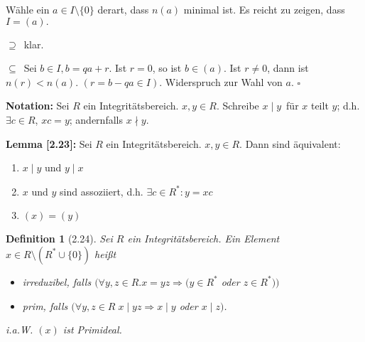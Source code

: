 \documentclass[10pt,a4paper]{article}
\newtheorem{defi}{Definition}
\begin{document}
Wähle ein $a \in I \setminus \{0\}$ derart, dass $n(a)$ minimal ist. Es reicht zu zeigen, dass $I = (a).$

\glqq $\supseteq$\grqq\ klar.

\glqq $\subseteq$\grqq\ Sei $b \in I, b = qa + r$. Ist $r = 0$, so ist $b \in (a)$. Ist $r \neq 0$, dann ist $n(r) < n(a)$. $(r = b - qa \in I)$. Widerspruch zur Wahl von $a$. $\square$\bigskip

\textbf{Notation:} Sei $R$ ein Integritätsbereich. $x,y \in R$. Schreibe \glqq $x \mid y$\grqq\ für \glqq $x$ teilt $y$\grqq ; d.h. $\exists c \in R$, $xc = y$; andernfalls \glqq $x \nmid y$\grqq .

\textbf{Lemma [2.23]:} Sei $R$ ein Integritätsbereich. $x,y \in R$. Dann sind äquivalent: \begin{enumerate}
\item $x \mid y$ und $y \mid x$

\item $x$ und $y$ sind assoziiert, d.h. $\exists c \in R^*: y = xc$

\item $(x) = (y)$
\end{enumerate}

\begin{defi}[2.24]
Sei $R$ ein Integritätsbereich. Ein Element $x \in R \setminus (R^* \cup \{0\})$ heißt \begin{itemize}
\item \emph{irreduzibel}, falls $(\forall y,z \in R. x = yz \Rightarrow (y \in R^*$ oder $z \in R^*))$
\item \emph{prim}, falls $(\forall y, z \in R \; x \mid yz \Rightarrow x \mid y$ oder $x \mid z)$.
\end{itemize}
i.a.W. $(x)$ ist Primideal.
\end{defi}
\end{document}
